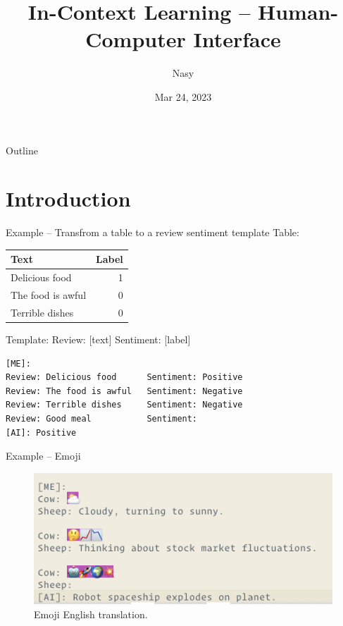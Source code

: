 \documentclass[aspectratio=1610,xcolor={dvipsnames},hyperref={colorlinks,unicode,linkcolor=violet,anchorcolor=BlueViolet,citecolor=YellowOrange,filecolor=black,urlcolor=Aquamarine}]{beamer}
\author{Nasy}
\date{Mar 24, 2023}
\title{In-Context Learning -- Human-Computer Interface}
\begin{document}
\maketitle
\begin{frame}{Outline}
\setcounter{tocdepth}{1}
\tableofcontents
\end{frame}

\setcounter{tocdepth}{2}

\section{Introduction}
\label{sec:orgb735d61}

\begin{frame}[label={sec:org5c3e51a},fragile]{Example -- Transfrom a table to a review sentiment template}
 Table:

\begin{center}
\begin{tabular}{lr}
\toprule
Text & Label\\[0pt]
\midrule
Delicious food & 1\\[0pt]
The food is awful & 0\\[0pt]
Terrible dishes & 0\\[0pt]
\bottomrule
\end{tabular}
\end{center}

Template: Review: [text] Sentiment: [label]

\begin{verbatim}
[ME]:
Review: Delicious food      Sentiment: Positive
Review: The food is awful   Sentiment: Negative
Review: Terrible dishes     Sentiment: Negative
Review: Good meal           Sentiment:
[AI]: Positive
\end{verbatim}
\end{frame}

\begin{frame}[label={sec:org99f6144}]{Example -- Emoji}
\begin{figure}[htbp]
\centering
\includegraphics[width=.9\linewidth]{./pex1.png}
\caption{\label{fig:org68b9ee0}Emoji English translation.}
\end{figure}
\end{frame}
\end{document}

